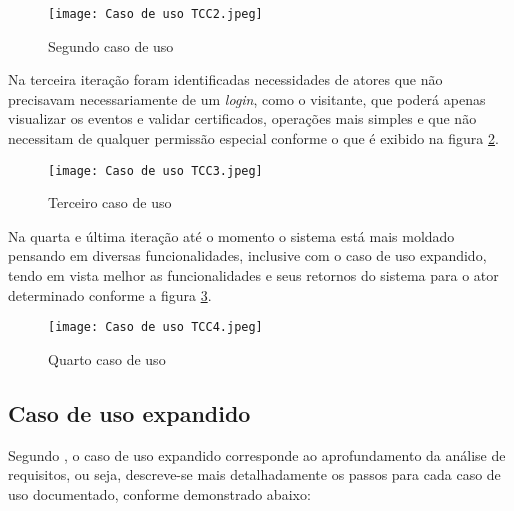 \begin{figure}[H]
    \caption{\label{caso_uso_2}Segundo caso de uso}
    \vspace{5pt}
    \centering
    \texttt{[image: Caso de uso TCC2.jpeg]}
    \vspace{5pt}
\end{figure}

Na terceira iteração foram identificadas necessidades de atores que não precisavam necessariamente de um \textit{login}, como o visitante, que poderá apenas visualizar os eventos e validar certificados, operações mais simples e que não necessitam de qualquer permissão especial conforme o que é exibido na figura \ref{caso_uso_3}. 

\begin{figure}[H]
    \caption{\label{caso_uso_3}Terceiro caso de uso}
    \vspace{5pt}
    \centering
    \texttt{[image: Caso de uso TCC3.jpeg]}
    \vspace{5pt}
\end{figure}

Na quarta e última iteração até o momento o sistema está mais moldado pensando em diversas funcionalidades, inclusive com o caso de uso expandido, tendo em vista melhor as funcionalidades e seus retornos do sistema para o ator determinado conforme a figura \ref{caso_uso_4}.

\begin{figure}[H]
    \caption{\label{caso_uso_4}Quarto caso de uso}
    \vspace{5pt}
    \centering
    \texttt{[image: Caso de uso TCC4.jpeg]}
    \vspace{5pt}
\end{figure}

\subsection{Caso de uso expandido}
Segundo , o caso de uso expandido corresponde ao aprofundamento da análise de requisitos, ou seja, descreve-se mais detalhadamente os passos para cada caso de uso documentado, conforme demonstrado abaixo:

